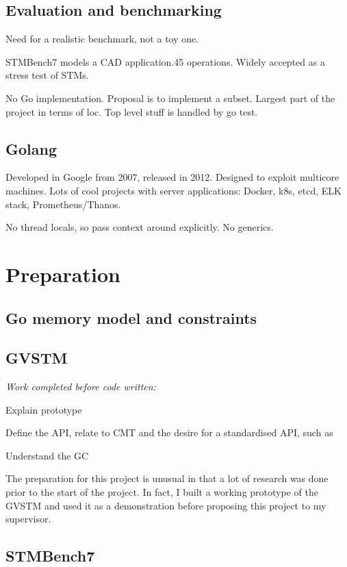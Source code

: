 \documentclass[12pt,a4paper,twoside,openright]{report}
\begin{document}
\section{Evaluation and benchmarking}
\label{sec:eval-benchm}

Need for a realistic benchmark, not a toy one.

STMBench7 models a CAD application.45 operations. Widely accepted as a
stress test of STMs.

No Go implementation.  Proposal is to implement a subset.  Largest
part of the project in terms of loc. Top level stuff is handled by go
test.

\section{Golang}
\label{sec:golang}

Developed in Google from 2007, released in 2012.  Designed to exploit
multicore machines.  Lots of cool projects with server applications:
Docker, k8s, etcd, ELK stack, Prometheus/Thanos.

No thread locals, so pass context around explicitly. No generics.

\chapter{Preparation}

\section{Go memory model and constraints}
\label{sec:go-memory-model}

\section{GVSTM}
\label{sec:prep:gvstm}

{ \em Work completed before code written:

  Explain prototype

  Define the API, relate to CMT and the desire for a standardised API,
  such as

  Understand the GC }

The preparation for this project is unusual in that a lot of research
was done prior to the start of the project. In fact, I built a working
prototype of the GVSTM and used it as a demonstration before proposing
this project to my supervisor.

\section{STMBench7}
\label{sec:prep:stmbench7}
\end{document}
